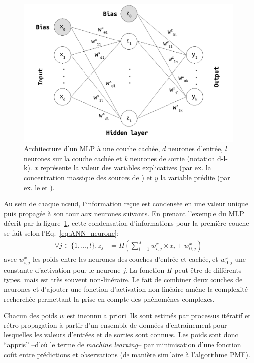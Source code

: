 \begin{figure}[ht]
    \centering
    \includegraphics[width=0.7\linewidth]{figures/chapter05/MLP_architecture.pdf}
    \caption[Architecture simplifée d'un MLP à une couche cachée]{Architecture d'un MLP à une couche cachée, $d$ neurones d'entrée, $l$
    neurones sur la couche cachée et $k$ neurones de sortie (notation d-l-k). $x$
    représente la valeur des variables explicatives (par ex. la concentration massique des
    sources de \PMdix) et $y$ la variable prédite (par ex. le \POAAv{} et \PODTTv).}%
    \label{fig:MLP_architecture}
\end{figure}

Au sein de chaque nœud, l'information reçue est condensée en une valeur unique puis propagée à
son tour aux neurones suivants. En prenant l'exemple du MLP décrit par la
figure~\ref{fig:MLP_architecture}, cette condensation d'informations pour la première
couche se fait selon l'Eq.~\ref{eq:ANN_neurone}:
\begin{align}
    \label{eq:ANN_neurone}
    \forall j \in \{1, ..., l\}, z_j &= H\left( \sum_{i=1}^d w^x_{i,j} \times x_i + w^x_{0,j} \right)
\end{align}
avec $w^x_{i,j}$ les poids entre les neurones des couches d'entrée et cachée, et
$w^x_{0,j}$ une constante d'activation pour le neurone $j$. La fonction $H$
peut-être de différents types, mais est très souvent non-linéraire. Le fait de combiner
deux
couches de neurones et d'ajouter une fonction d'activation non linéaire amène la
complexité recherchée permettant la prise en compte des phénomènes complexes.

Chacun des poids $w$ est inconnu a priori. Ils sont estimés par processus itératif et
rétro-propagation à partir d'un ensemble de données d'entraînement pour lesquelles les
valeurs d'entrées et de sorties sont connues. Les poids sont donc ``appris'' --d'où le
terme de \textit{machine learning}-- par minimisation d'une fonction coût entre prédictions
et observations (de manière similaire à l'algorithme PMF).


